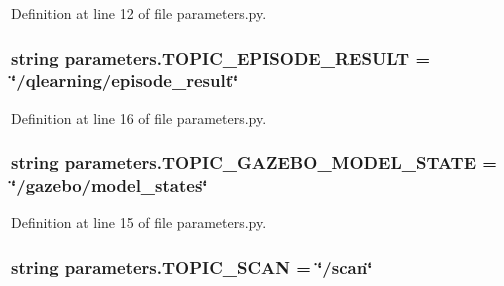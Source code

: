 Definition at line 12 of file parameters.\+py.

\subsubsection[{\texorpdfstring{T\+O\+P\+I\+C\+\_\+\+E\+P\+I\+S\+O\+D\+E\+\_\+\+R\+E\+S\+U\+LT}{TOPIC_EPISODE_RESULT}}]{\setlength{\rightskip}{0pt plus 5cm}string parameters.\+T\+O\+P\+I\+C\+\_\+\+E\+P\+I\+S\+O\+D\+E\+\_\+\+R\+E\+S\+U\+LT = \char`\"{}/qlearning/episode\+\_\+result\char`\"{}}\hypertarget{namespaceparameters_aa69db8cd2d598f0d10212ea8df6a2139}{}\label{namespaceparameters_aa69db8cd2d598f0d10212ea8df6a2139}


Definition at line 16 of file parameters.\+py.

\subsubsection[{\texorpdfstring{T\+O\+P\+I\+C\+\_\+\+G\+A\+Z\+E\+B\+O\+\_\+\+M\+O\+D\+E\+L\+\_\+\+S\+T\+A\+TE}{TOPIC_GAZEBO_MODEL_STATE}}]{\setlength{\rightskip}{0pt plus 5cm}string parameters.\+T\+O\+P\+I\+C\+\_\+\+G\+A\+Z\+E\+B\+O\+\_\+\+M\+O\+D\+E\+L\+\_\+\+S\+T\+A\+TE = \char`\"{}/gazebo/model\+\_\+states\char`\"{}}\hypertarget{namespaceparameters_a9d4157266ec0afde91ab7d58be4f688d}{}\label{namespaceparameters_a9d4157266ec0afde91ab7d58be4f688d}


Definition at line 15 of file parameters.\+py.

\subsubsection[{\texorpdfstring{T\+O\+P\+I\+C\+\_\+\+S\+C\+AN}{TOPIC_SCAN}}]{\setlength{\rightskip}{0pt plus 5cm}string parameters.\+T\+O\+P\+I\+C\+\_\+\+S\+C\+AN = \char`\"{}/scan\char`\"{}}\hypertarget{namespaceparameters_a28de242cdbba10666eb0c95aaef6812b}{}\label{namespaceparameters_a28de242cdbba10666eb0c95aaef6812b}


